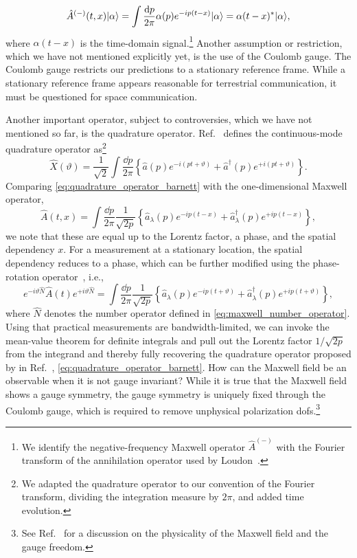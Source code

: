 \begin{equation}
	\hat{A}^{(-)}(t,x)
	\ket{\alpha}
	=
	\int\frac{\dd{p}}{2\pi}
	\alpha(p)
	e^{-ip(t-x)}
	\ket{\alpha}
	=
	\alpha(t-x)^*
	\ket{\alpha}
	,
\end{equation}
where $\alpha(t-x)$ is the time-domain signal.\footnote{We identify the negative-frequency Maxwell operator $\hat{A}^{(-)}$ with the Fourier transform of the annihilation operator used by Loudon~\cite{Loudon2000}.}
Another assumption or restriction, which we have not mentioned explicitly yet, is the use of the Coulomb gauge.
The Coulomb gauge restricts our predictions to a stationary reference frame.
While a stationary reference frame appears reasonable for terrestrial communication, it must be questioned for space communication.

Another important operator, subject to controversies, which we have not mentioned so far, is the quadrature operator.
Ref.~\cite[p.~79]{Barnett2002} defines the continuous-mode quadrature operator as\footnote{We adapted the quadrature operator to our convention of the Fourier transform, dividing the integration measure by $2\pi$, and added time evolution.}
\begin{equation}
	\hat{X}(\vartheta)
	=
	\frac{1}{\sqrt{2}}
	\int\frac{\dd{p}}{2\pi}
	\left\{
		\hat{a}(p)
		e^{-i(pt+\vartheta)}
		+
		\hat{a}^\dagger(p)
		e^{+i(pt+\vartheta)}
	\right\}
	.
	\label{eq:quadrature_operator_barnett}
\end{equation}
Comparing \cref{eq:quadrature_operator_barnett} with the one-dimensional Maxwell operator,
\begin{equation}
	\hat{A}(t,x)
	=
	\int\frac{\dd{p}}{2\pi}
	\frac{1}{\sqrt{2p}}
	\left\{
		\hat{a}_\lambda(p)
		e^{-ip(t-x)}
		+
		\hat{a}_\lambda^\dagger(p)
		e^{+ip(t-x)}
	\right\}
	,
\end{equation}
we note that these are equal up to the Lorentz factor, a phase, and the spatial dependency $x$.
For a measurement at a stationary location, the spatial dependency reduces to a phase, which can be further modified using the phase-rotation operator~\cite[p.~38]{Leonhardt2010}, i.e.,
\begin{equation}
	e^{-i\vartheta\hat{N}}
	\hat{A}(t)
	e^{+i\vartheta\hat{N}}
	=
	\int\frac{\dd{p}}{2\pi}
	\frac{1}{\sqrt{2p}}
	\left\{
		\hat{a}_\lambda(p)
		e^{-ip(t+\vartheta)}
		+
		\hat{a}_\lambda^\dagger(p)
		e^{+ip(t+\vartheta)}
	\right\}
	,
\end{equation}
where $\hat{N}$ denotes the number operator defined in \cref{eq:maxwell_number_operator}.
Using that practical measurements are bandwidth-limited, we can invoke the mean-value theorem for definite integrals and pull out the Lorentz factor $1/\sqrt{2p}$ from the integrand and thereby fully recovering the quadrature operator proposed by in Ref.~\cite{Barnett2002}, \cref{eq:quadrature_operator_barnett}.
How can the Maxwell field be an observable when it is not gauge invariant?
While it is true that the Maxwell field shows a gauge symmetry, the gauge symmetry is uniquely fixed through the Coulomb gauge, which is required to remove unphysical polarization \glspl{dof}.\footnote{See Ref.~\cite{stackexchange676622} for a discussion on the physicality of the Maxwell field and the gauge freedom.}